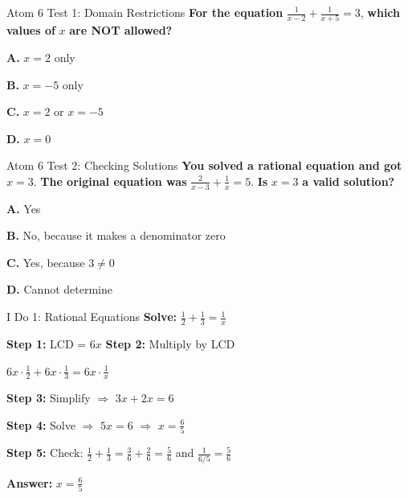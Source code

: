 \documentclass[12pt]{beamer}
\begin{document}
\begin{frame}{Atom 6 Test 1: Domain Restrictions}
\textbf{For the equation} $\displaystyle\frac{1}{x-2} + \frac{1}{x+5} = 3$, \textbf{which values of} $x$ \textbf{are NOT allowed?}

\vspace{0.5cm}

\textbf{A.} $x = 2$ only

\textbf{B.} $x = -5$ only

\textbf{C.} $x = 2$ or $x = -5$ \hfill {}

\textbf{D.} $x = 0$
\end{frame}

\begin{frame}{Atom 6 Test 2: Checking Solutions}
\textbf{You solved a rational equation and got} $x = 3$. \textbf{The original equation was} $\displaystyle\frac{2}{x-3} + \frac{1}{x} = 5$. \textbf{Is} $x = 3$ \textbf{a valid solution?}

\vspace{0.5cm}

\textbf{A.} Yes

\textbf{B.} No, because it makes a denominator zero \hfill {}

\textbf{C.} Yes, because $3 \neq 0$

\textbf{D.} Cannot determine
\end{frame}

\begin{frame}{I Do 1: Rational Equations}
\textbf{Solve:} $\displaystyle\frac{1}{2} + \frac{1}{3} = \frac{1}{x}$

\pause
\vspace{0.3cm}

\textbf{Step 1:} LCD = $6x$ \quad \pause \textbf{Step 2:} Multiply by LCD

\pause
$6x \cdot \displaystyle\frac{1}{2} + 6x \cdot \frac{1}{3} = 6x \cdot \frac{1}{x}$

\pause
\vspace{0.3cm}

\textbf{Step 3:} Simplify $\Rightarrow$ $3x + 2x = 6$

\pause
\vspace{0.3cm}

\textbf{Step 4:} Solve $\Rightarrow$ $5x = 6$ \pause $\Rightarrow$ $x = \displaystyle\frac{6}{5}$

\pause
\vspace{0.3cm}

\textbf{Step 5:} Check: $\displaystyle\frac{1}{2} + \frac{1}{3} = \frac{3}{6} + \frac{2}{6} = \frac{5}{6}$ and $\frac{1}{6/5} = \frac{5}{6}$ \checkmark

\pause
\vspace{0.3cm}

\Large \textbf{Answer:} $x = \displaystyle\frac{6}{5}$
\end{frame}
\end{document}
